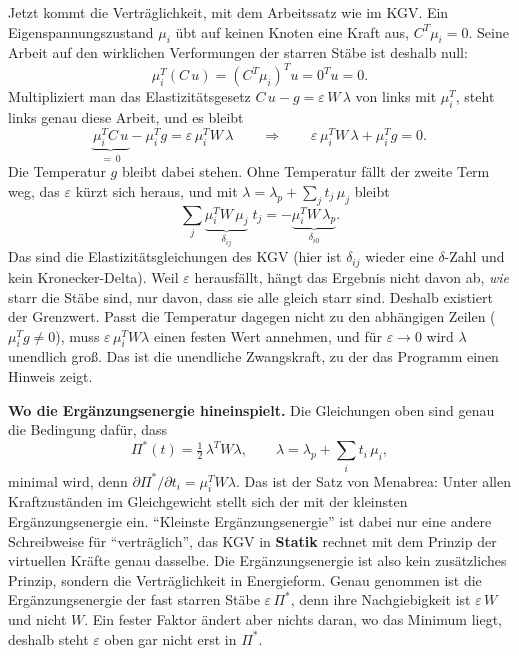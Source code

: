 Jetzt kommt die Verträglichkeit, mit dem Arbeitssatz wie im KGV. Ein Eigenspannungszustand $\mu_i$
übt auf keinen Knoten eine Kraft aus, $C^T\mu_i = 0$. Seine Arbeit auf den wirklichen Verformungen
der starren Stäbe ist deshalb null:
\[
  \mu_i^T (C\,u) = (C^T\mu_i)^T u = 0^T u = 0 .
\]
Multipliziert man das Elastizitätsgesetz $C\,u - g = \varepsilon\,W\,\lambda$ von links mit
$\mu_i^T$, steht links genau diese Arbeit, und es bleibt
\[
  \underbrace{\mu_i^T C\,u}_{=\,0} - \mu_i^T g = \varepsilon\,\mu_i^T W\,\lambda
  \qquad\Longrightarrow\qquad
  \varepsilon\,\mu_i^T W\,\lambda + \mu_i^T g = 0 .
\]
Die Temperatur $g$ bleibt dabei stehen. Ohne Temperatur fällt der zweite Term weg, das $\varepsilon$ kürzt sich heraus, und mit
$\lambda = \lambda_p + \sum_j t_j\,\mu_j$ bleibt
\[
  \sum_j \underbrace{\mu_i^T W\,\mu_j}_{\delta_{ij}}\;t_j
  = -\underbrace{\mu_i^T W\,\lambda_p}_{\delta_{i0}} .
\]
Das sind die Elastizitätsgleichungen des KGV (hier ist $\delta_{ij}$ wieder eine $\delta$-Zahl und
kein Kronecker-Delta). Weil $\varepsilon$ herausfällt, hängt das Ergebnis nicht davon ab,
\emph{wie} starr die Stäbe sind, nur davon, dass sie alle gleich starr sind. Deshalb existiert der
Grenzwert. Passt die Temperatur dagegen nicht zu den abhängigen Zeilen ($\mu_i^T g \ne 0$), muss
$\varepsilon\,\mu_i^T W \lambda$ einen festen Wert annehmen, und für $\varepsilon \to 0$ wird
$\lambda$ unendlich groß. Das ist die unendliche Zwangskraft, zu der das Programm einen Hinweis
zeigt.

\textbf{Wo die Ergänzungsenergie hineinspielt.} Die Gleichungen oben sind genau die Bedingung dafür,
dass
\[
  \Pi^*(t) = \tfrac12\,\lambda^T W \lambda , \qquad \lambda = \lambda_p + \sum_i t_i\,\mu_i ,
\]
minimal wird, denn $\partial\Pi^*/\partial t_i = \mu_i^T W \lambda$. Das ist der Satz von Menabrea:
Unter allen Kraftzuständen im Gleichgewicht stellt sich der mit der kleinsten Ergänzungsenergie
ein. \enquote{Kleinste Ergänzungsenergie} ist dabei nur eine andere Schreibweise für
\enquote{verträglich}, das KGV in \textbf{Statik} rechnet mit dem Prinzip der virtuellen Kräfte
genau dasselbe. Die Ergänzungsenergie ist also kein zusätzliches Prinzip, sondern die
Verträglichkeit in Energieform. Genau genommen ist die Ergänzungsenergie der fast starren Stäbe
$\varepsilon\,\Pi^*$, denn ihre Nachgiebigkeit ist $\varepsilon\,W$ und nicht $W$. Ein fester
Faktor ändert aber nichts daran, wo das Minimum liegt, deshalb steht $\varepsilon$ oben gar nicht
erst in $\Pi^*$.

